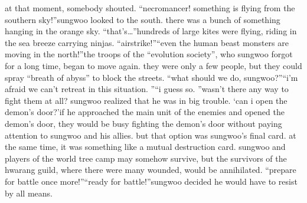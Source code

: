 at that moment, somebody shouted.
“necromancer! something is flying from the southern sky!”sungwoo looked to the south.
 there was a bunch of something hanging in the orange sky.
“that’s…”hundreds of large kites were flying, riding in the sea breeze carrying ninjas.
“airstrike!”“even the human beast monsters are moving in the north!”the troops of the “evolution society”, who sungwoo forgot for a long time, began to move again.
 they were only a few people, but they could spray “breath of abyss” to block the streets.
“what should we do, sungwoo?”“i’m afraid we can’t retreat in this situation.
”“i guess so.
”wasn’t there any way to fight them at all? sungwoo realized that he was in big trouble.
‘can i open the demon’s door?’if he approached the main unit of the enemies and opened the demon’s door, they would be busy fighting the demon’s door without paying attention to sungwoo and his allies.
but that option was sungwoo’s final card.
 at the same time, it was something like a mutual destruction card.
sungwoo and players of the world tree camp may somehow survive, but the survivors of the hwarang guild, where there were many wounded, would be annihilated.
“prepare for battle once more!”“ready for battle!”sungwoo decided he would have to resist by all means.


 
